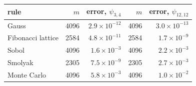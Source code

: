 \begin{tabular}{lrrrr}
\toprule
rule & $m$ & error, $\psi_{3,4}$ & $m$ & error, $\psi_{12,12}$ \\
\midrule
Gauss & 4096 & $2.9\times10^{-12}$ & 4096 & $3.0\times10^{-13}$ \\
Fibonacci lattice & 2584 & $4.8\times10^{-11}$ & 2584 & $1.7\times10^{-9}$ \\
Sobol & 4096 & $1.6\times10^{-3}$ & 4096 & $2.2\times10^{-3}$ \\
Smolyak & 2305 & $7.5\times10^{-9}$ & 2305 & $2.7\times10^{-3}$ \\
Monte Carlo & 4096 & $5.8\times10^{-3}$ & 4096 & $1.0\times10^{-2}$ \\
\bottomrule
\end{tabular}
